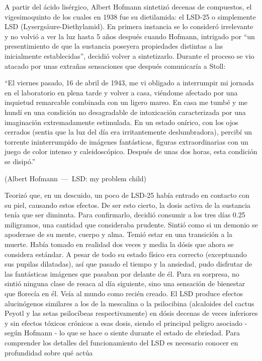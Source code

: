 A partir del ácido lisérgico, Albert Hofmann sintetizó decenas de compuestos, el vigesimoquinto de los cuales en 1938 fue su dietilamida: el LSD-25 o simplemente LSD (Lysergsäure-Diethylamid). En primera instancia se lo consideró irrelevante y no volvió a ver la luz hasta 5 años después cuando Hofmann, intrigado por \enquote{un presentimiento de que la sustancia poseyera propiedades distintas a las inicialmente establecidas}, decidió volver a sintetizarlo. Durante el proceso se vio atacado por unas extrañas sensaciones que después comunicaría a Stoll:

\let\oldquote\quote
\let\endoldquote\endquote
\renewenvironment{quote}[2][]
  {\if\relax\detokenize{#1}\relax
     \def\quoteauthor{#2}%
   \else
     \def\quoteauthor{#2~---~#1}%
   \fi
   \oldquote}
  {\par\nobreak\smallskip\hfill(\quoteauthor)%
   \endoldquote\addvspace{\bigskipamount}}

\begin{quote}[LSD: my problem child]{Albert Hofmann}
	\enquote{El viernes pasado, 16 de abril de 1943, me vi obligado a interrumpir mi jornada en el laboratorio en plena tarde y volver a casa, viéndome afectado por una inquietud remarcable combinada con un ligero mareo. En casa me tumbé y me hundí en una condición no desagradable de intoxicación caracterizada por una imaginación extremadamente estimulada. En un estado onírico, con los ojos cerrados (sentia que la luz del día era irritantemente deslumbradora), percibí un torrente ininterrumpido de imágenes fantásticas, figuras extraordinarias con un juego de color intenso y caleidoscópico. Después de unas dos horas, esta condición se disipó.}
\end{quote}

Teorizó que, en un descuido, un poco de LSD-25 había entrado en contacto con su piel, causando estos efectos. De ser esto cierto, la dosis activa de la sustancia tenía que ser diminuta. Para confirmarlo, decidió consumir a los tres días 0.25 miligramos, una cantidad que consideraba prudente. Sintió como si un demonio se apoderase de su mente, cuerpo y alma. Temió estar en una transición a la muerte. Había tomado en realidad dos veces y media la dósis que ahora se considera estándar. A pesar de todo su estado físico era correcto (exceptuando sus pupilas dilatadas), así que pasado el tiempo y la ansiedad, pudo disfrutar de las fantásticas imágenes que pasaban por delante de él. Para su sorpresa, no sintió ninguna clase de resaca al día siguiente, sino una sensación de bienestar que florecía en él. Veía al mundo como recién creado. El LSD produce efectos alucinógenos similares a los de la mescalina o la psilocibina (alcaloides del cactus Peyotl y las setas psilocíbeas respectivamente) en dósis decenas de veces inferiores y sin efectos tóxicos crónicos a esas dosis, siendo el principal peligro asociado - según Hofmann - lo que se hace o siente durante el estado de ebriedad. Para comprender los detalles del funcionamiento del LSD es necesario conocer en profundidad sobre qué actúa

\newpage
